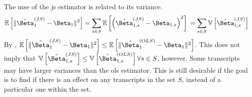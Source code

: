 The \gls{mse} of the \gls{js} estimator is related to its variance.
%
\begin{equation*}
  \expect{ \Vert \hat{\Beta}_1^{(JS)} - \Beta_1 \Vert ^2 }
  = \sum_{s \in S} \expect{ \left( \hat{\Beta}_{1,s}^{(JS)} - \Beta_{1,s} \right)^2 } \\
  = \sum_{s \in S} \variance{ \hat{\Beta}_{1,s}^{(JS)} }
\end{equation*}
%
By \cite[REF][]{bockMinimaxEstimatorsMean1975}, $\mathbb{E} \left[ \Vert \hat{\Beta}_1^{(JS)} - \Beta_1 \Vert ^2\right] \le \mathbb{E} \left[ \Vert \hat{\Beta}_1^{(OLS)} - \Beta_1 \Vert ^2\right]$.
This does not imply that $\variance{ \hat{\Beta}_{1,s}^{(JS)} } \le \variance{ \hat{\Beta}_{1,s}^{(OLS)} } \forall s \in S$, however.
Some transcripts may have larger variances than the \gls{ols} estimator.
This is still desirable if the goal is to find if there is an effect on any transcripts in the set $S$, instead of a particular one within the set.


